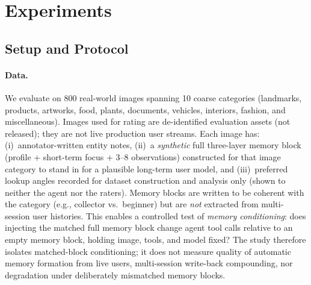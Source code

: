 \documentclass[11pt,a4paper]{article}
\begin{document}
\section{Experiments}

\subsection{Setup and Protocol}

\paragraph{Data.}
We evaluate on 800 real-world images spanning 10 coarse categories (landmarks, products, artworks, food, plants, documents, vehicles, interiors, fashion, and miscellaneous). Images used for rating are de-identified evaluation assets (not released); they are not live production user streams. Each image has: (i)~annotator-written entity notes, (ii)~a \emph{synthetic} full three-layer memory block (profile + short-term focus + 3--8 observations) constructed for that image category to stand in for a plausible long-term user model, and (iii)~preferred lookup angles recorded for dataset construction and analysis only (shown to neither the agent nor the raters). Memory blocks are written to be coherent with the category (e.g., collector vs.\ beginner) but are \emph{not} extracted from multi-session user histories. This enables a controlled test of \emph{memory conditioning}: does injecting the matched full memory block change agent tool calls relative to an empty memory block, holding image, tools, and model fixed? The study therefore isolates matched-block conditioning; it does not measure quality of automatic memory formation from live users, multi-session write-back compounding, nor degradation under deliberately mismatched memory blocks.
\end{document}
